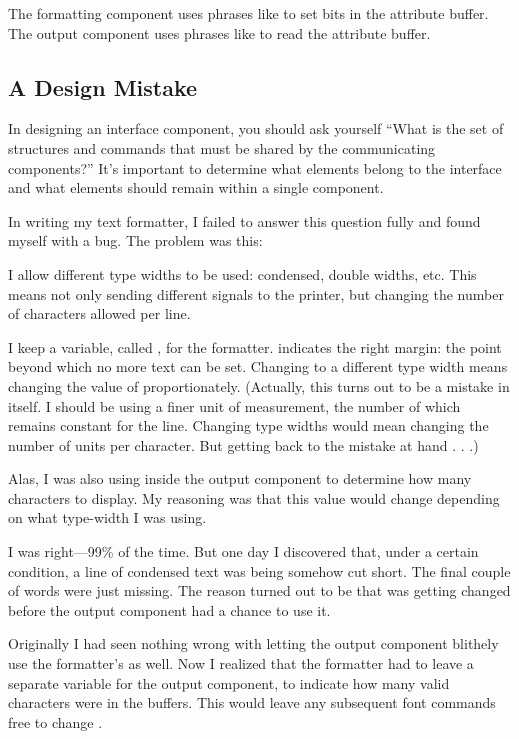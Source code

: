 The formatting component uses phrases like 
to set bits in the attribute buffer. The output component uses phrases
like  to read the attribute buffer.

\subsection{A Design Mistake}

In designing an interface component, you should ask yourself ``What is
the set of structures and commands that must be shared by the
communicating components?'' It's important to determine what elements
belong to the interface and what elements should remain within a
single component.

In writing my text formatter, I failed to answer this question fully
and found myself with a bug. The problem was this:

I allow different type widths to be used: condensed, double widths,
etc. This means not only sending different signals to the printer, but
changing the number of characters allowed per line.

I keep a variable, called , for the formatter.  indicates
the right margin: the point beyond which no more text can be set. Changing
to a different type width means changing the value of  proportionately.
(Actually, this turns out to be a mistake in itself. I should be
using a finer unit of measurement, the number of which remains constant
for the line. Changing type widths would mean changing the number of
units per character. But getting back to the mistake at hand . . .)

Alas, I was also using  inside the output component to determine
how many characters to display. My reasoning was that this value would
change depending on what type-width I was using.

I was right---99\% of the time. But one day I discovered that, under
a certain condition, a line of condensed text was being somehow cut
short. The final couple of words were just missing. The reason turned out
to be that  was getting changed before the output component had
a chance to use it.

Originally I had seen nothing wrong with letting the output component
blithely use the formatter's  as well. Now I realized that the
formatter had to leave a separate variable for the output component,
to indicate how many valid characters were in the buffers. This would
leave any subsequent font commands free to change .

